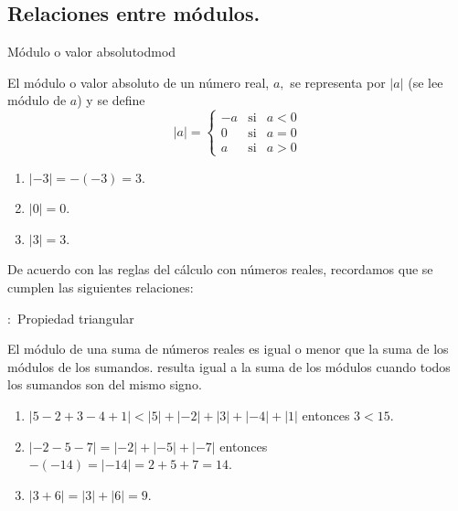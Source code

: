 \documentclass[oneside,english,spanish,2m,twoside,svgnames,x11names,HTML,twoside,12pt]{libro-matua}\usepackage[]{graphicx}\usepackage[]{color}
\begin{document}
\subsection{Relaciones entre módulos.}

\begin{defi}{Módulo o valor absoluto}{dmod}

El módulo o valor absoluto de un número real, $a,$ se representa
por $\left|a\right|$ (se lee módulo de $a$) y se define 
\begin{equation}
\left|a\right|=\left\{ \begin{array}{ccc}
-a & \text{si} & a<0\\
0 & \text{si} & a=0\\
a & \text{si} & a>0
\end{array}\right.\label{eq:modulo}
\end{equation}

\end{defi}

\begin{ejemplos}
\begin{enumerate}
\item $\left|-3\right|=-\left(-3\right)=3$.
\item $\left|0\right|=0.$
\item $\left|3\right|=3.$
\end{enumerate}
\end{ejemplos}

De acuerdo con las reglas del cálculo con números reales, recordamos
que se cumplen las siguientes relaciones:

\begin{propiedad}{\hspace{-2pt}:\ Propiedad triangular}

El módulo de una suma de números reales es igual o menor que la suma
de los módulos de los sumandos. resulta igual a la suma de los módulos
cuando todos los sumandos son del mismo signo.

\end{propiedad}

\begin{ejemplos}
\begin{enumerate}
\item $\left|5-2+3-4+1\right|<\left|5\right|+\left|-2\right|+\left|3\right|+\left|-4\right|+\left|1\right|$
entonces $3<15.$
\item $\left|-2-5-7\right|=\left|-2\right|+\left|-5\right|+\left|-7\right|$
entonces $-\left(-14\right)=\left|-14\right|=2+5+7=14.$
\item $\left|3+6\right|=\left|3\right|+\left|6\right|=9.$
\end{enumerate}
\end{ejemplos}
\end{document}
